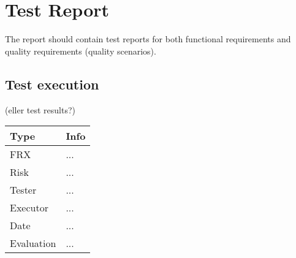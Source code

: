 \chapter{Test Report}

The report should contain test reports for both functional requirements and quality requirements (quality scenarios).



\section{Test execution}
(eller test results?)

\begin{tabular}{|l|l|}
	\hline
	\bf{Type}	& \bf{Info} \\
	\hline
	FRX			& ... \\
	Risk		& ... \\
	Tester		& ... \\
	Executor	& ... \\
	Date		& ... \\
	Evaluation	& ... \\
	\hline
\end{tabular}
